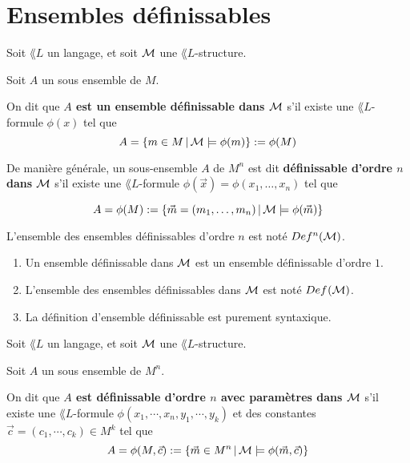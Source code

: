 \documentclass[a4paper, 12pt]{report}
\begin{document}
\chapter{Ensembles définissables}

\begin{definition} 
	Soit $\lang{L}$ un langage, et soit $\struct{M}$ une $\lang{L}$-structure.

	Soit $A$ un sous ensemble de $M$.

	On dit que \textbf{$A$ est un ensemble définissable dans $\struct{M}$} s'il
	existe une $\lang{L}$-formule $\phi(x)$ tel que
	\begin{equation}
		A = \GSsetDef{m \in M}{\struct{M} \models \phi(m)} := \phi(M)
	\end{equation}

	De manière générale, un sous-ensemble $A$ de $M^{n}$ est dit
	\textbf{définissable d'ordre $n$ dans $\struct{M}$} s'il existe une
	$\lang{L}$-formule $\phi(\vec{x}) = \phi(x_{1}, \dots, x_{n})$ tel que

	\begin{equation}
		A = \phi(M) := \GSsetDef{\vec{m} = (m_{1}, \dots, m_{n})}{\struct{M}
		\models \phi(\vec{m})}
	\end{equation}

	L'ensemble des ensembles définissables d'ordre $n$ est noté
	$\definissableSet[n]{\struct{M}}$.
\end{definition}

\begin{remarque}
	\begin{enumerate}
		\item Un ensemble définissable dans $\struct{M}$ est un ensemble définissable
	d'ordre $1$.
		\item L'ensemble des ensembles définissables dans $\struct{M}$ est noté
			$\definissableSet{\struct{M}}$.
		\item La définition d'ensemble définissable est purement syntaxique.
	\end{enumerate}
\end{remarque}

\begin{definition}
	Soit $\lang{L}$ un langage, et soit $\struct{M}$ une $\lang{L}$-structure.

	Soit $A$ un sous ensemble de $M^{n}$.

	On dit que \textbf{$A$ est définissable d'ordre $n$ avec paramètres dans
		$\struct{M}$} s'il existe une $\lang{L}$-formule $\phi(x_{1}, \cdots,
		x_{n}, y_{1}, \cdots, y_{k})$ et des constantes $\vec{c} = (c_{1},
		\cdots, c_{k}) \in M^{k}$ tel que
	\begin{equation}
		A = \phi(M, \vec{c}) := \GSsetDef{\vec{m} \in M^{n}}{\struct{M} \models
		\phi(\vec{m}, \vec{c})}
	\end{equation}
\end{definition}
\end{document}

